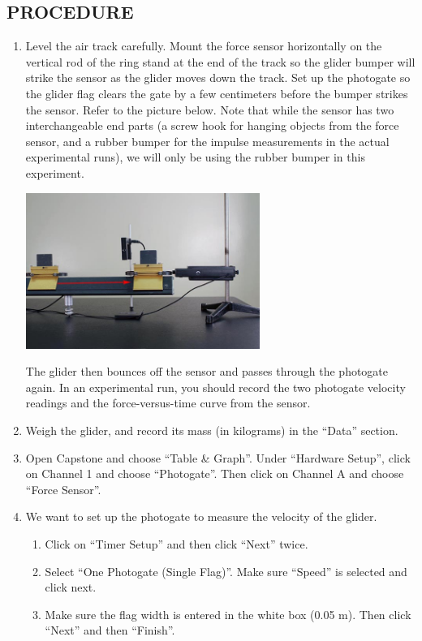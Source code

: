 \subsection*{PROCEDURE}

\begin{enumerate}[label=\arabic*.]

\item Level the air track carefully.  Mount the force sensor horizontally on the vertical rod of the ring stand at the end of the track so the glider bumper will strike the sensor as the glider moves down the track.  
Set up the photogate so the glider flag clears the gate by a few centimeters before the bumper strikes the sensor.  Refer to the picture below.
Note that while the sensor has two interchangeable end parts (a screw hook for
hanging objects from the force sensor, and a rubber bumper
for the impulse measurements in the actual experimental runs),
we will only be using the rubber bumper in this experiment.

\begin{center} \includegraphics*[width=0.6\textwidth]{imgs/6labs/6Alab/6Aexp5/gif_still.jpg} \end{center}
The glider then bounces off the sensor and passes through the photogate again.  In an experimental run, you should record the two photogate velocity readings and the force-versus-time curve from the sensor.

\item Weigh the glider, and record its mass (in kilograms) in the ``Data'' section.

\item Open Capstone and choose ``Table \& Graph''.  Under ``Hardware Setup'', click on Channel 1 and choose ``Photogate''.  Then click on Channel A and choose ``Force Sensor''.

\item We want to set up the photogate to measure the velocity of the glider.
\begin{enumerate}[label=\alph*.]
\item Click on ``Timer Setup'' and then click ``Next'' twice.
\item Select ``One Photogate (Single Flag)''.  Make sure ``Speed'' is selected and click next.
\item Make sure the flag width is entered in the white box (0.05 m).  Then click ``Next'' and then ``Finish''.
\end{enumerate}


\end{enumerate}
